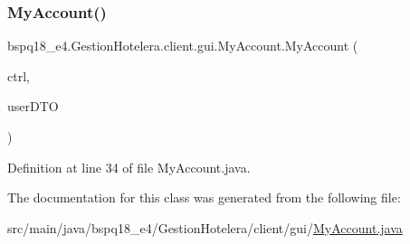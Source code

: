 \subsubsection{\texorpdfstring{My\+Account()}{MyAccount()}}
{\footnotesize\ttfamily bspq18\+\_\+e4.\+Gestion\+Hotelera.\+client.\+gui.\+My\+Account.\+My\+Account (\begin{DoxyParamCaption}\item[{\mbox{\hyperlink{classbspq18__e4_1_1_gestion_hotelera_1_1client_1_1controller_1_1_controller}{Controller}}}]{ctrl,  }\item[{\mbox{\hyperlink{classbspq18__e4_1_1_gestion_hotelera_1_1server_1_1dto_1_1_user_d_t_o}{User\+D\+TO}}}]{user\+D\+TO }\end{DoxyParamCaption})}



Definition at line 34 of file My\+Account.\+java.



The documentation for this class was generated from the following file\+:\begin{DoxyCompactItemize}
\item 
src/main/java/bspq18\+\_\+e4/\+Gestion\+Hotelera/client/gui/\mbox{\hyperlink{_my_account_8java}{My\+Account.\+java}}\end{DoxyCompactItemize}
